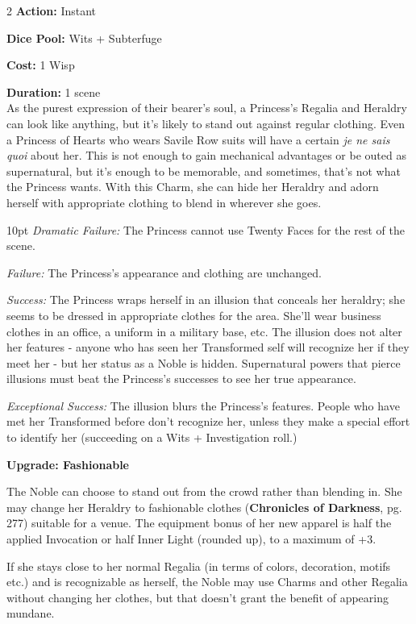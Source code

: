 \begin{multicols}{2}
\noindent \textbf{Action:} Instant

\noindent \textbf{Dice Pool:} Wits + Subterfuge

\noindent \textbf{Cost:} 1 Wisp 

\noindent \textbf{Duration:} 1 scene \\

\noindent As the purest expression of their bearer's soul, a Princess's Regalia and Heraldry can look like anything, but it's likely to stand out against regular clothing. Even a Princess of Hearts who wears Savile Row suits will have a certain \textit{je ne sais quoi} about her. This is not enough to gain mechanical advantages or be outed as supernatural, but it's enough to be memorable, and sometimes, that's not what the Princess wants. With this Charm, she can hide her Heraldry and adorn herself with appropriate clothing to blend in wherever she goes.

\begin{myindentpar}{10pt}
    \emph{Dramatic Failure:} The Princess cannot use Twenty Faces for the rest of the scene.

    \emph{Failure:} The Princess's appearance and clothing are unchanged.

    \emph{Success:} The Princess wraps herself in an illusion that conceals her heraldry; she seems to be dressed in appropriate clothes for the area. She'll wear business clothes in an office, a uniform in a military base, etc. The illusion does not alter her features - anyone who has seen her Transformed self will recognize her if they meet her - but her status as a Noble is hidden. Supernatural powers that pierce illusions must beat the Princess's successes to see her true appearance.

    \emph{Exceptional Success:} The illusion blurs the Princess's features. People who have met her Transformed before don't recognize her, unless they make a special effort to identify her (succeeding on a Wits + Investigation roll.)
	
\textbf{Upgrade: Fashionable}

The Noble can choose to stand out from the crowd rather than blending in. She may change her Heraldry to fashionable clothes (\textbf{Chronicles of Darkness}, pg. 277) suitable for a venue. The equipment bonus of her new apparel is half the applied Invocation or half Inner Light (rounded up), to a maximum of +3. 

If she stays close to her normal Regalia (in terms of colors, decoration, motifs etc.) and is recognizable as herself, the Noble may use Charms and other Regalia without changing her clothes, but that doesn’t grant the benefit of appearing mundane. 
	

\end{myindentpar}
\end{multicols}
